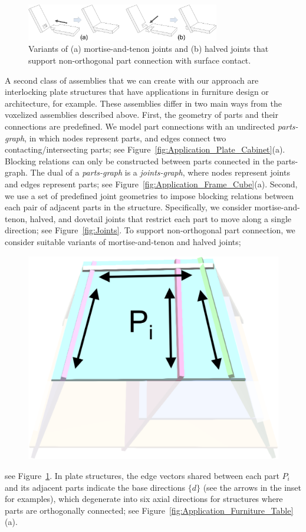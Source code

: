  \begin{figure}[!t]
	\centering
	\includegraphics[width=8.45cm]{images/Application_Plate_Joints.png}
	\vspace*{-2.5mm}
	\caption{Variants of (a) mortise-and-tenon joints and (b) halved joints that support non-orthogonal part connection with surface contact.
	}
	\vspace*{-4.0mm}
	\label{fig:Application_Plate_Joints}
\end{figure}
 
A second class of assemblies that we can create with our approach are interlocking plate structures that have applications in furniture design or architecture, for example.
These assemblies differ in two main ways from the voxelized assemblies described above.
First, the geometry of parts and their connections are predefined. We model part connections with an undirected {\em parts-graph}, in which nodes represent parts, and edges connect two contacting/intersecting parts; see Figure~\ref{fig:Application_Plate_Cabinet}(a). 
Blocking relations can only be constructed between parts connected in the parts-graph.
The dual of a {\em parts-graph} is a {\em joints-graph}, where nodes represent joints and edges represent parts; see Figure~\ref{fig:Application_Frame_Cube}(a). 
Second, we use a set of predefined joint geometries to impose blocking relations between each pair of adjacent parts in the structure. 
Specifically, we consider mortise-and-tenon, halved, and dovetail joints that restrict each part to move along a single direction; see Figure~\ref{fig:Joints}.
To support non-orthogonal part connection, we consider suitable variants of mortise-and-tenon and halved joints;
\setlength{\columnsep}{12pt}
\begin{figure}
	\vspace{-12pt}
	\centering
	\hspace{-8pt}
	\includegraphics[width=0.30\columnwidth]{images/Application_Plate_Direction.png}
	\vspace{-11pt}
\end{figure}
see Figure~\ref{fig:Application_Plate_Joints}.
In plate structures,  the edge vectors shared between each part $P_i$ and its adjacent parts indicate the base directions $\{d\}$ (see the arrows in the inset for examples), which degenerate into six axial directions for structures where parts are orthogonally connected; see Figure~\ref{fig:Application_Furniture_Table}(a).

